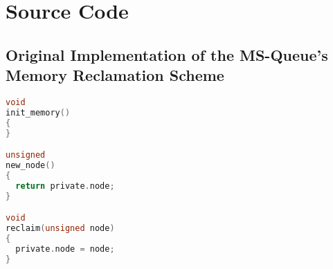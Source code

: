 \chapter{Source Code}
\section{Original Implementation of the MS-Queue's Memory Reclamation Scheme}

\begin{lstlisting}[language=C,caption={Memory management used in \citeauthor{michael1996simple}'s original implementation of the MS queue},label={lst:ms_queue_memory}]
void
init_memory()
{
}

unsigned
new_node()
{
  return private.node;
}

void
reclaim(unsigned node)
{
  private.node = node;
}
\end{lstlisting}
